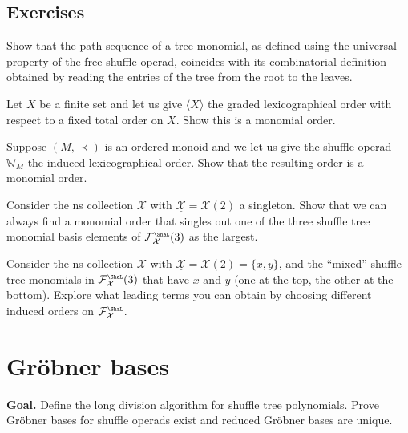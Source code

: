 \documentclass[fleqn, a4paper, twoside]{article}
\newcommand{\Sha}{{\scaleobj{0.75}{\ShaL}}}
\newcommand{\0}{\langle 0\rangle}
\newcommand{\XX}{\mathcal{X}}
\newcommand{\FF}{\mathcal{F}}
\DeclareRobustCommand{\[}{\begin{equation}}%
\DeclareRobustCommand{\]}{\end{equation}}%
\theoremstyle{mytheorem}
\theoremstyle{introthm}
\newcommand{\hacer}[1]{\todo[inline,linecolor=blue,backgroundcolor=blue!25!white,bordercolor=blue]{#1}}
\theoremstyle{mydefinition}
\theoremstyle{mydefinition2}
\theoremstyle{plain} %
\newcommand{\?}{\,?\,}
\theoremstyle{mytheorem}
\theoremstyle{plain} %
\begin{document}
\hacer{Add examples of orderings.}

\newpage

\subsection{Exercises}
 
\begin{question}\label{ex:pathseq}
Show that the path sequence of a tree monomial, as defined
using the universal property of the free shuffle operad,
coincides with its combinatorial definition obtained
by reading the entries of the tree from the
root to the leaves.
\end{question}
 
\begin{question}
Let $X$ be a finite set and let us give 
$\langle X\rangle$ the graded lexicographical order with
respect to a fixed total order on $X$. Show this is a
monomial order.
\end{question}

\begin{question}\label{ex:orderedM}
Suppose $(M,\prec)$ is an ordered monoid and
we let us give the shuffle operad
$\mathbb{W}_M$ the induced lexicographical 
order. Show that the resulting order is a monomial
order.
\end{question}

\begin{question}
Consider the ns collection $\XX$ with $\underline{\XX} = \XX(2)$
a singleton. Show that we can always find a monomial order that
singles out one of the three shuffle tree monomial basis
elements of $\FF_\XX^\Sha(3)$ as the largest. 
\end{question}

\begin{question}
Consider the ns collection $\XX$ with $\underline{\XX} = \XX(2)
= \{x,y\}$, and the ``mixed'' shuffle tree monomials in 
$\FF_\XX^\Sha(3)$ that have $x$ and $y$ (one at the top,
the other at the bottom). Explore what leading terms
you can obtain by choosing different induced orders
on $\FF_\XX^\Sha$.
\end{question}

 \pagebreak
 
\section{Gr\"obner bases}

\textbf{Goal.} Define the long division algorithm for shuffle
tree polynomials. Prove Gr\"obner bases for shuffle operads exist
and reduced Gr\"obner bases are unique.
\end{document}
